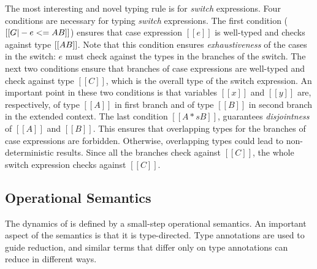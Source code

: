 The most interesting and novel typing rule is for
\emph{switch} expressions. Four conditions are necessary for typing
\emph{switch} expressions.
The first condition ($[[G |-
    e <= A \/ B]]$) ensures that case expression $[[e]]$ is well-typed
and checks against type $[[A \/ B]]$. Note that this condition ensures
\emph{exhaustiveness} of the cases in the switch: $e$ must
check against the types in the branches of the switch. 
The next two conditions ensure that
branches of case expressions are well-typed and check against type
$[[C]]$, which is the overall type of the switch expression.
An important point in these two conditions is that variables
$[[x]]$ and $[[y]]$ are, respectively, of type $[[A]]$ in first branch and of type $[[B]]$ in
second branch in the extended context. 
The last condition
$[[A *s B]]$, guarantees \emph{disjointness} of $[[A]]$ and $[[B]]$.
This ensures that overlapping types for the branches of case expressions
are forbidden. Otherwise, overlapping types could lead to
non-deterministic results.
Since all the branches check against $[[C]]$, the whole
switch expression checks against $[[C]]$.

\begin{comment}
\begin{figure}[t]
  \begin{small}
    \centering
    \drules[typ]{$ [[G |- e dirflag A]] $}{Bidirectional Typing}{int, var, ann, app, sub, abs, typeof}
  \end{small}
  \caption{Typing for \cal.}
  \label{fig:union:typ}
\end{figure}
\end{comment}

\subsection{Operational Semantics}
\label{sec:union:os}
The dynamics of \cal is defined by a small-step operational semantics.
An important aspect of the semantics is that it is type-directed.
Type annotations are used to guide reduction, and similar terms
that differ only on type annotations can reduce in different ways.

